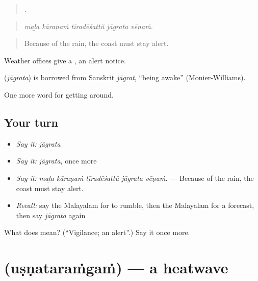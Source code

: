 \begin{quote}
    .
\end{quote}

\begin{quote}
\emph{maḻa kāraṇaṁ tīradēśattŭ jāgrata vēṇaṁ.}
\end{quote}

\begin{quote}
Because of the rain, the coast must stay alert.
\end{quote}

Weather offices give a  , an alert notice.

\begin{cousinweb}
\textbf{} (\emph{jāgrata}) is borrowed from Sanskrit \emph{jāgrat}, \textquotedblleft{}being awake\textquotedblright{} (Monier-Williams).
\end{cousinweb}

\begin{grammarlens}[title={What you've built}]
One more word for getting around.
\end{grammarlens}

\subsection*{Your turn}
\begin{itemize}
\raggedright
  \item \emph{Say it:} \emph{jāgrata}
  \item \emph{Say it:} \emph{jāgrata}, once more
  \item \emph{Say it:} \emph{maḻa kāraṇaṁ tīradēśattŭ jāgrata vēṇaṁ.} — Because of the rain, the coast must stay alert.
  \item \emph{Recall:} say the Malayalam for to rumble, then the Malayalam for a forecast, then say \emph{jāgrata} again
\end{itemize}

\begin{tcolorbox}[breakable,colback=teal!4,colframe=teal!35!black,title={Before you move on}]
What does  mean? (\textquotedblleft{}Vigilance; an alert\textquotedblright{}.) Say it once more.
\end{tcolorbox}
\section[\texorpdfstring{\ml{ഉഷ്ണതരംഗം} (uṣṇataraṁgaṁ)}{ഉഷ്ണതരംഗം (uṣṇataraṁgaṁ)}]{ (uṣṇataraṁgaṁ) — a heatwave}

